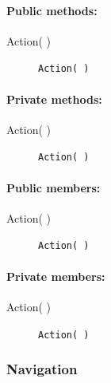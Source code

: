 \paragraph{Public methods:}
\begin{adjustwidth}{2.5em}{0pt}\begin{description}
		\item [Action( )] \texttt{Action( )}
\end{description}\end{adjustwidth}

\paragraph{Private methods:}
\begin{adjustwidth}{2.5em}{0pt}\begin{description}
		\item [Action( )] \texttt{Action( )}
\end{description}\end{adjustwidth}

\paragraph{Public members:}
\begin{adjustwidth}{2.5em}{0pt}\begin{description}
		\item [Action( )] \texttt{Action( )} 
\end{description}\end{adjustwidth}

\paragraph{Private members:}
\begin{adjustwidth}{2.5em}{0pt}\begin{description}
		\item [Action( )] \texttt{Action( )}
\end{description}\end{adjustwidth}

\subsubsection{Navigation}

